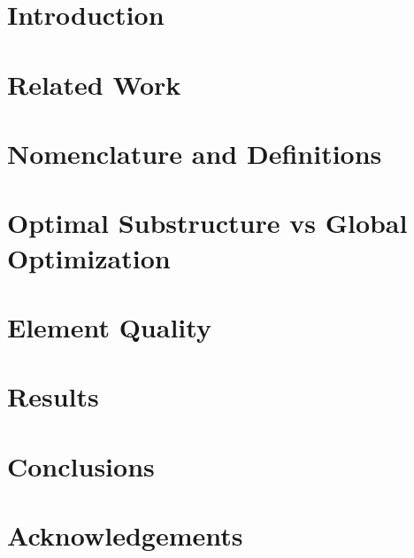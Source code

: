 \documentclass[11pt]{article}
\begin{document}
\section{Introduction}


\section{Related Work}

\section{Nomenclature and Definitions}


\section{Optimal Substructure vs Global Optimization}


\section{Element Quality}
\section{Results}
\section{Conclusions}
\section{Acknowledgements}
\end{document}
